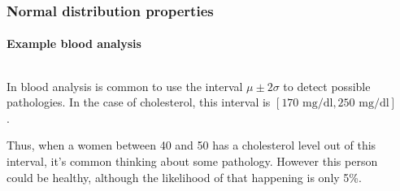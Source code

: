 \begin{frame}
\frametitle{Normal distribution properties}
\framesubtitle{Example blood analysis}
\begin{columns}
\begin{column}{0.47\textwidth}
In blood analysis is common to use the interval $\mu\pm 2\sigma$ to detect possible pathologies.
In the case of cholesterol, this interval is $[170\text{ mg/dl}, 250\text{ mg/dl}]$. 

Thus, when a women between 40 and 50 has a cholesterol level out of this interval, it's common thinking about some
pathology. However this person could be healthy, although the likelihood of that happening is only 5\%.
\end{column}
\begin{column}{0.47\textwidth}
\begin{center}
\end{center}
\end{column}
\end{columns}
\end{frame}


